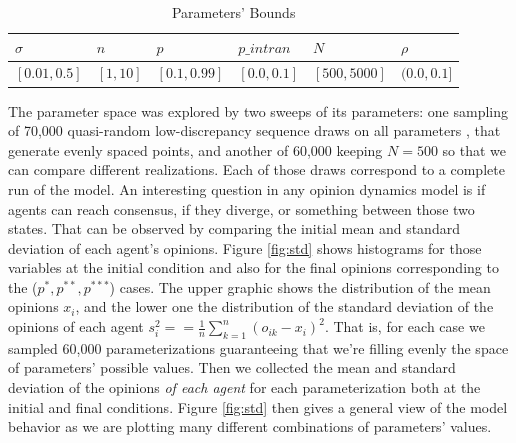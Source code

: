 \documentclass{article}
\begin{document}
{  \begin{table}[H]
    \centering
\begin{tabular}{@{}|l|l|l|l|l|l|@{}}
\toprule
\rowcolor[HTML]{EFEFEF}
$\sigma$ & $n$ & $p$ & $p\_intran$ & $N$ & $\rho$ \\ \midrule
$[0.01, 0.5]$ & $[1, 10]$  & $[0.1, 0.99]$ & $[0.0, 0.1]$ & $[500, 5000]$ & $(0.0, 0.1]$ \\ \bottomrule
\end{tabular}
\caption{Parameters' Bounds}
\end{table}

The parameter space was explored by two sweeps of its parameters: one sampling
of 70,000 quasi-random low-discrepancy sequence draws on all parameters
\cite{saltelli2008global, saltelli2000sensitivity}, that generate evenly spaced
points, and another of 60,000 keeping \(N=500\) so that we can compare different
realizations. Each of those draws correspond to a complete run of the model.
An interesting question in any opinion dynamics model is if agents
can reach consensus, if they diverge, or something between those two states.
That can be observed by comparing the initial mean and standard deviation of
each agent's opinions. Figure \ref{fig:std} shows histograms for those variables
at the initial condition and also for the final opinions corresponding to the
(\(p^{*}, p^{**}, p^{***}\)) cases. The upper graphic shows the distribution of
the mean opinions $x_i$, and the lower one the distribution of the standard
deviation of the opinions of each agent $s_i^2== \frac{1}{n} \sum_{k=1}^{n}
(o_{ik}-x_i)^2$. That is, for each case we sampled 60,000 parameterizations
guaranteeing that we're filling evenly the space of parameters' possible values.
Then we collected the mean and standard deviation of the opinions \textit{of
  each agent} for each parameterization both at the initial and final
conditions. Figure \ref{fig:std} then gives a general view of the model behavior
as we are plotting many different combinations of parameters' values.

\begin{figure}[H]
  \centering \captionsetup{justification=centering,margin=2cm}


\end{figure}}
\end{document}
